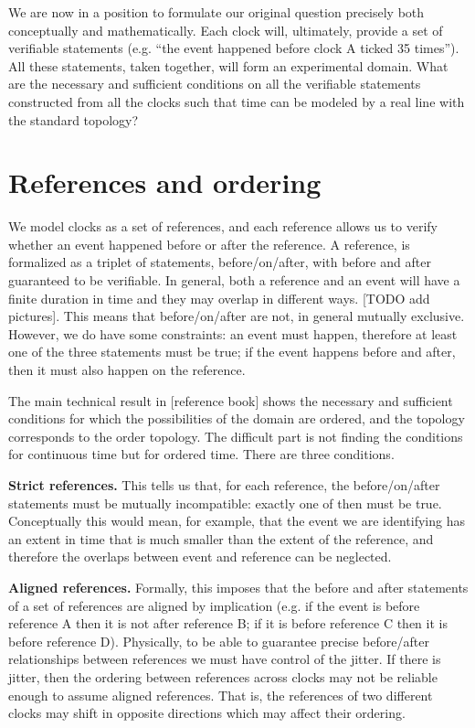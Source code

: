 \documentclass[10pt,twocolumn, nofootinbib]{revtex4-2}
\begin{document}
We are now in a position to formulate our original question precisely both conceptually and mathematically. Each clock will, ultimately, provide a set of verifiable statements (e.g. ``the event happened before clock A ticked 35 times''). All these statements, taken together, will form an experimental domain. What are the necessary and sufficient conditions on all the verifiable statements constructed from all the clocks such that time can be modeled by a real line with the standard topology?

\section{References and ordering}

We model clocks as a set of references, and each reference allows us to verify whether an event happened before or after the reference. A reference, is formalized as a triplet of statements, before/on/after, with before and after guaranteed to be verifiable. In general, both a reference and an event will have a finite duration in time and they may overlap in different ways. [TODO add pictures]. This means that before/on/after are not, in general mutually exclusive. However, we do have some constraints: an event must happen, therefore at least one of the three statements must be true; if the event happens before and after, then it must also happen on the reference.

The main technical result in [reference book] shows the necessary and sufficient conditions for which the possibilities of the domain are ordered, and the topology corresponds to the order topology. The difficult part is not finding the conditions for continuous time but for ordered time. There are three conditions.

\textbf{Strict references.} This tells us that, for each reference, the before/on/after statements must be mutually incompatible: exactly one of then must be true. Conceptually this would mean, for example, that the event we are identifying has an extent in time that is much smaller than the extent of the reference, and therefore the overlaps between event and reference can be neglected.

\textbf{Aligned references.} Formally, this imposes that the before and after statements of a set of references are aligned by implication (e.g. if the event is before reference A then it is not after reference B; if it is before reference C then it is before reference D). Physically, to be able to guarantee precise before/after relationships between references we must have control of the jitter. If there is jitter, then the ordering between references across clocks may not be reliable enough to assume aligned references. That is, the references of two different clocks may shift in opposite directions which may affect their ordering.
\end{document}
